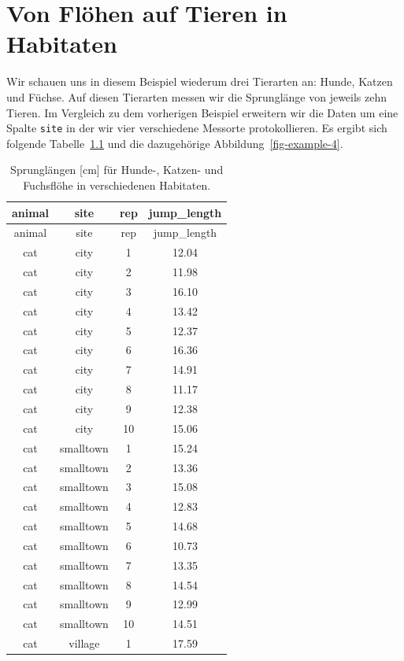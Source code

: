 \documentclass[
  letterpaper,
  DIV=11,
  oneside]{scrreport}
\begin{document}
\hypertarget{sec-example-4}{%
\chapter{Von Flöhen auf Tieren in Habitaten}\label{sec-example-4}}

Wir schauen uns in diesem Beispiel wiederum drei Tierarten an: Hunde,
Katzen und Füchse. Auf diesen Tierarten messen wir die Sprunglänge von
jeweils zehn Tieren. Im Vergleich zu dem vorherigen Beispiel erweitern
wir die Daten um eine Spalte \texttt{site} in der wir vier verschiedene
Messorte protokollieren. Es ergibt sich folgende
Tabelle~\ref{tbl-example-4} und die dazugehörige
Abbildung~\ref{fig-example-4}.

\hypertarget{tbl-example-4}{}
\begin{longtable}[]{@{}cccc@{}}
\caption{\label{tbl-example-4}Sprunglängen {[}cm{]} für Hunde-, Katzen-
und Fuchsflöhe in verschiedenen Habitaten.}\tabularnewline
\toprule()
animal & site & rep & jump\_length \\
\midrule()
\endfirsthead
\toprule()
animal & site & rep & jump\_length \\
\midrule()
\endhead
cat & city & 1 & 12.04 \\
cat & city & 2 & 11.98 \\
cat & city & 3 & 16.10 \\
cat & city & 4 & 13.42 \\
cat & city & 5 & 12.37 \\
cat & city & 6 & 16.36 \\
cat & city & 7 & 14.91 \\
cat & city & 8 & 11.17 \\
cat & city & 9 & 12.38 \\
cat & city & 10 & 15.06 \\
cat & smalltown & 1 & 15.24 \\
cat & smalltown & 2 & 13.36 \\
cat & smalltown & 3 & 15.08 \\
cat & smalltown & 4 & 12.83 \\
cat & smalltown & 5 & 14.68 \\
cat & smalltown & 6 & 10.73 \\
cat & smalltown & 7 & 13.35 \\
cat & smalltown & 8 & 14.54 \\
cat & smalltown & 9 & 12.99 \\
cat & smalltown & 10 & 14.51 \\
cat & village & 1 & 17.59 \\

\end{longtable}
\end{document}
